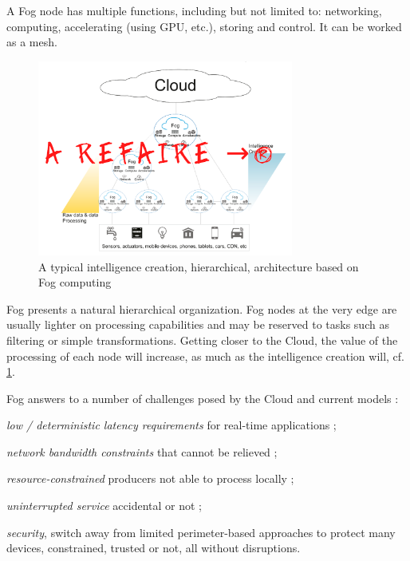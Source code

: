 \documentclass[11pt]{sdm}
\begin{document}
\begin{description}
	A Fog node has multiple functions, including but not limited to: networking, computing, accelerating (using \gls{GPU}, etc.), storing and control. It can be worked as a mesh.
	
	\begin{figure}[t]
		\centering
		\includegraphics[width=0.75\textwidth]{./assets/FogArchi.png}
		\caption{A typical intelligence creation, hierarchical, architecture based on Fog computing}
		\label{fig:fog_archi}
	\end{figure}
	
	Fog presents a natural hierarchical organization. Fog nodes at the very edge are usually lighter on processing capabilities and may be reserved to tasks such as filtering or simple transformations. Getting closer to the Cloud, the value of the processing of each node will increase, as much as the intelligence creation will, cf. \cref{fig:fog_archi}.
	
	Fog answers to a number of challenges posed by the Cloud and current models \cite{chiang_fog_2016}: 
	\begin{enumerate*}[(a)]
		\item \emph{low / deterministic latency requirements} for real-time applications ;
		\item \emph{network bandwidth constraints} that cannot be relieved ;
		\item \emph{resource-constrained} producers not able to process locally ;
		\item \emph{uninterrupted service} accidental or not ;
		\item \emph{security}, switch away from limited perimeter-based approaches to protect many devices, constrained, trusted or not, all without disruptions.
	\end{enumerate*}
	

\end{description}
\end{document}

